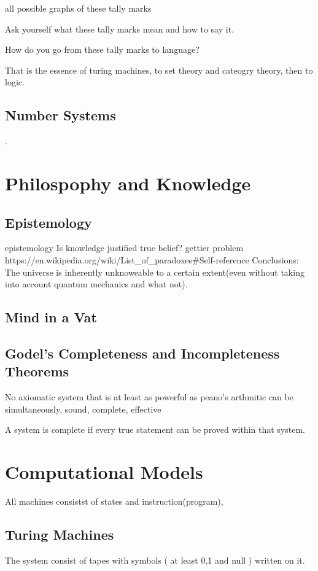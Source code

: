 \documentclass{book}
\begin{document}
all possible graphs of these tally marks

Ask yourself what these tally marks mean and how to say it.

How do you go from these tally marks to language?

That is the essence of turing machines, to set theory and cateogry theory, then to logic.

\section{Number Systems}

.
\chapter{Philospophy and Knowledge}

\section{Epistemology}
epistemology 
Is knowledge justified true belief?
gettier problem
https://en.wikipedia.org/wiki/List_of_paradoxes#Self-reference
Conclusions: The universe is inherently unknoweable to a certain extent(even without taking into account quantum mechanics and what not). 

\section{Mind in a Vat}



\section{Godel's Completeness and Incompleteness Theorems}

No axiomatic system that is at least as powerful as peano's arthmitic can be simultaneously,
sound, complete, effective

A system is complete if every true statement can be proved within that system. 

\chapter{Computational Models}


All machines consistst of states and instruction(program),



\section{Turing Machines}
The system consist of tapes with symbols ( at least 0,1 and null ) written on it.
\end{document}
